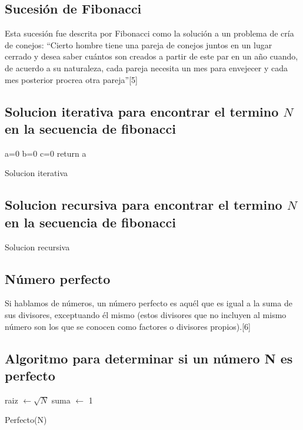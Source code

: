 \documentclass[spanish]{article}
\begin{document}
	\subsection{Sucesión de Fibonacci}
	Esta sucesión fue descrita por Fibonacci como la solución a un problema de cría de conejos: “Cierto hombre tiene una pareja de conejos juntos en un lugar cerrado y desea saber cuántos son creados a partir de este par en un año cuando, de acuerdo a su naturaleza, cada pareja necesita un mes para envejecer y cada mes posterior procrea otra pareja”[5]
	\subsection*{Solucion iterativa para encontrar el termino $N$ en la secuencia de fibonacci}
	\begin{algorithm}[H]
		a=0\;
  	    b=0\;
  	    c=0\;
		return a\;
		\caption{Solucion iterativa}
	\end{algorithm}
	\subsection*{Solucion recursiva para encontrar el termino $N$ en la secuencia de fibonacci}
	\begin{algorithm}[H]
		\caption{Solucion recursiva}
	\end{algorithm}
	\subsection{Número perfecto}
	Si hablamos de números, un número perfecto es aquél que es igual a la suma de sus divisores, exceptuando él mismo (estos divisores que no incluyen al mismo número son los que se conocen como factores o divisores propios).[6]
	\subsection{Algoritmo para determinar si un número N es perfecto}
	\begin{algorithm}[H]
		raiz $\gets\sqrt{N}$\;
		suma $\gets$ 1\;	
		\caption{Perfecto(N)}
	\end{algorithm}	
\end{document}
